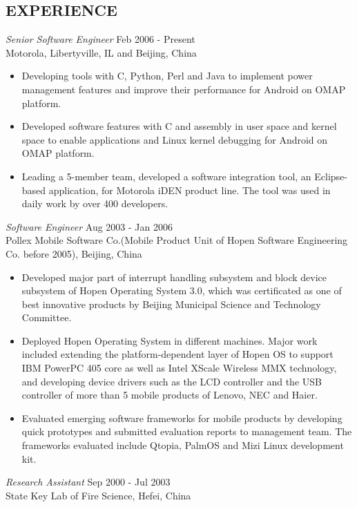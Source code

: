\documentclass{res}
\begin{document}
\begin{resume}
\section{EXPERIENCE} {\sl Senior Software Engineer} \hfill Feb 2006 - Present \\
                Motorola, Libertyville, IL and Beijing, China
\vspace{0.1in}
                \begin{itemize}  %
                \item Developing tools with C, Python, Perl and Java to implement power management
                  features and improve their performance for Android on OMAP platform.
                \item Developed software features with C and assembly in user space and kernel space
                  to enable applications and Linux kernel debugging for Android on OMAP platform.
                \item Leading a 5-member team, developed a software integration tool, 
                  an Eclipse-based application, for Motorola iDEN product line. The tool 
                  was used in daily work by over 400 developers.
                \end{itemize}
 
                {\sl Software Engineer} \hfill                  Aug 2003 - Jan 2006 \\
                Pollex Mobile Software Co.(Mobile Product
                Unit of Hopen Software Engineering Co. before 2005), Beijing, China

                 \begin{itemize}  %
                 \item Developed major part of interrupt handling subsystem and block device
                   subsystem of Hopen Operating System 3.0, which was certificated as one of best
                   innovative products by Beijing Municipal Science and Technology Committee.
                 \item Deployed Hopen Operating System in different machines. Major work included
                   extending the platform-dependent layer of Hopen OS to support IBM PowerPC 405
                   core as well as Intel XScale Wireless MMX technology, and developing device
                   drivers such as the LCD controller and the USB controller of more than 5 mobile
                   products of Lenovo, NEC and Haier.
                 \item Evaluated emerging software frameworks for mobile products by developing 
                   quick prototypes and submitted evaluation reports to management team. The 
                   frameworks evaluated include Qtopia, PalmOS and Mizi Linux development kit.
                 \end{itemize}
                {\sl Research Assistant} \hfill                 Sep 2000 - Jul 2003 \\
                State Key Lab of Fire Science, Hefei, China


\end{resume}
\end{document}
